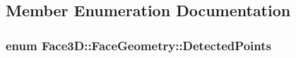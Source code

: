 \subsection{Member Enumeration Documentation}
\subsubsection[{\texorpdfstring{Detected\+Points}{DetectedPoints}}]{\setlength{\rightskip}{0pt plus 5cm}enum {\bf Face3\+D\+::\+Face\+Geometry\+::\+Detected\+Points}}\hypertarget{class_face3_d_1_1_face_geometry_aab597f00966010882927a4974649bf11}{}\label{class_face3_d_1_1_face_geometry_aab597f00966010882927a4974649bf11}
